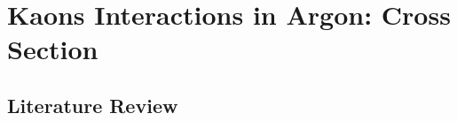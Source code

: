 \chapter{Kaons Interactions in Argon: Cross Section}\label{ch:Interactions}
\section{Literature Review}

 





